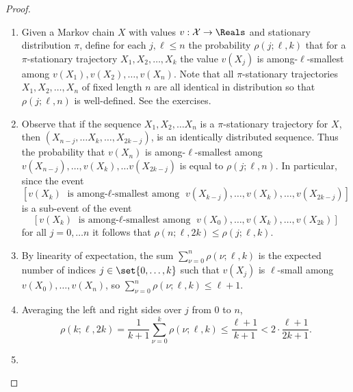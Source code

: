 \documentclass[12pt]{article}
\begin{document}
\begin{proof}
    \begin{enumerate}
        \item
            Given a Markov chain \( X \) with values \( v:  \mathcal{X}
            \to \Reals \) and stationary distribution \( \pi \), define
            for each \( j, \ell \le n \) the probability \( \rho(j; \ell,
            k) \) that for a \( \pi \)-stationary trajectory \( X_1, X_2,
            \dots, X_k \) the value \( v(X_j) \) is among-\( \ell \)-smallest
            among \( v(X_1), v(X_2), \dots, v(X_n) \). Note that all \(
            \pi \)-stationary trajectories \( X_1, X_2, \dots, X_n \) of
            fixed length \( n \) are all identical in distribution so
            that \( \rho(j; \ell, n) \) is well-defined. See the
            exercises.
        \item
            Observe that if the sequence \( X_1, X_2, \dots X_n \) is a \(
            \pi \)-stationary trajectory for \( X \), then \( (X_{n-j},
            \dots X_k, \dots, X_{2k-j}) \), is an identically
            distributed sequence.  Thus the probability that \( v(X_n) \)
            is among-\( \ell \)-smallest among \( v(X_{n-j}), \dots, v(X_k),
            \dots v(X_{2k-j}) \) is equal to \( \rho(j; \ell, n) \).  In
            particular, since the event
            \[
                [v(X_k) \text{ is among-$\ell$-smallest among } v(X_
                {k-j}), \dots, v(X_k), \dots, v(X_{2k-j})]
            \] is a sub-event of the event
            \[
                [v(X_k) \text{ is among-$\ell$-smallest among } v(X_0),
                \dots, v(X_k), \dots, v(X_{2k})]
            \] for all \( j = 0, \dots n \) it follows that \( \rho(n;
            \ell, 2k) \le \rho(j; \ell, k) \).
        \item
            By linearity of expectation, the sum \( \sum_{\nu=0}^n \rho(
            \nu; \ell, k) \) is the expected number of indices \( j \in
            \set{0, \dots, k} \) such that \( v(X_j) \) is \( \ell \)-small
            among \( v(X_0), \dots, v(X_n) \), so \( \sum_{\nu=0}^n \rho
            (\nu; \ell, k) \le \ell + 1 \).
        \item
            Averaging the left and right sides over \( j \) from \( 0 \)
            to \( n \),
            \[
                \rho(k; \ell, 2k) = \frac{1}{k+1} \sum_{\nu=0}^k \rho(\nu;
                \ell, k) \le \frac{\ell + 1}{k+1} < 2 \cdot \frac{\ell+1}
                {2k+1}.
            \]
        \item

\end{enumerate}
\end{proof}
\end{document}
